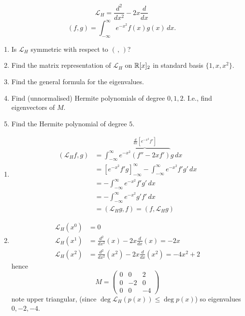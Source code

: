 \documentclass[10pt, a4paper]{article}
\begin{document}
\begin{problem}
    \[
    \mathcal{L}_H = \frac{d ^ 2}{dx ^ 2} - 2x\frac{d}{dx}
    \]
    \[
    (f, g) = \int_{-\infty}^{\infty}e ^ {-x ^ 2}f(x)g(x)\,dx.
    \]
    \begin{enumerate}[label = (\alph*)]
        \item Is $\mathcal{L}_H$ symmetric with respect to $(\,,\,)$?

        \item Find the matrix representation of $\mathcal{L}_H$ on $\mathbb{R}[x]_2$ in standard basis $\{1, x, x ^ 2\}$.

        \item Find the general formula for the eigenvalues.

        \item Find
        (unnormalised)
        Hermite polynomials of degree $0, 1, 2$.
        I.e.,
        find eigenvectors of $M$.

        \item Find the Hermite polynomial of degree $5$.
    \end{enumerate}

    \begin{solution}
        \begin{enumerate}[label = (\alph*)]
            \item
            \begin{align*}
                (\mathcal{L}_H f, g) &= \int_{-\infty}^{\infty}\overbrace{e ^ {-x ^ 2}(f'' - 2xf')}^{\frac{d}{dx}[e ^ {-x ^ 2}f']}g\,dx \\
                &= \left[e ^ {-x ^ 2}f'g\right]_{-\infty}^{\infty} - \int_{-\infty}^{\infty}e ^ {-x ^ 2}f'g'\,dx \\
                &= -\int_{-\infty}^{\infty}e ^ {-x ^ 2}f'g'\,dx \\
                &= -\int_{-\infty}^{\infty}e ^ {-x ^ 2}g'f'\,dx \\
                &= (\mathcal{L}_Hg, f) = (f, \mathcal{L}_H g)
            \end{align*}

            \item
            \begin{align*}
                \mathcal{L}_H(x ^ 0) &= 0 \\
                \mathcal{L}_H(x ^ 1) &= \frac{d ^ 2}{dx ^ 2}(x) - 2x\frac{d}{dx}(x) = -2x \\
                \mathcal{L}_H(x ^ 2) &= \frac{d ^ 2}{dx ^ 2}(x ^ 2) - 2x\frac{d}{dx}(x ^ 2) = -4x ^ 2 + 2
            \end{align*}
            hence
            \[
            M = \begin{pmatrix}
                0 & 0 & 2 \\
                0 & -2 & 0 \\
                0 & 0 & -4
            \end{pmatrix}
            \]
            note upper triangular,
            (since $\deg{\mathcal{L}_H}(p(x)) \leq \deg{p(x)}$)
            so eigenvalues $0, -2, -4$.


\end{enumerate}
\end{solution}
\end{problem}
\end{document}
